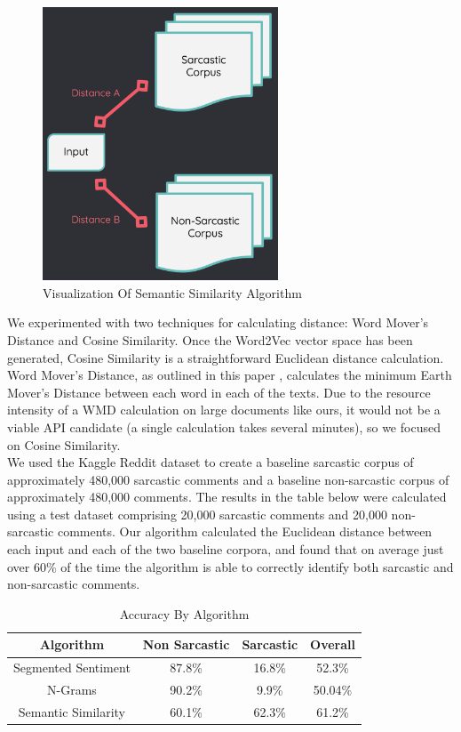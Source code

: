 \documentclass[conference]{IEEEtran}
\begin{document}
\begin{figure}[htbp]
\centerline{\includegraphics[width=7cm]{Screen Shot 2020-11-30 at 5.03.21 PM.png}}
\caption{Visualization Of Semantic Similarity Algorithm}
\label{fig7}
\end{figure}

We experimented with two techniques for calculating distance: Word Mover’s Distance and Cosine Similarity.  Once the Word2Vec vector space has been generated, Cosine Similarity is a straightforward Euclidean distance calculation.  Word Mover’s Distance, as outlined in this paper \cite{b7}, calculates the minimum Earth Mover’s Distance between each word in each of the texts.  Due to the resource intensity of a WMD calculation on large documents like ours, it would not be a viable API candidate (a single calculation takes several minutes), so we focused on Cosine Similarity.  \\ 
We used the Kaggle Reddit dataset to create a baseline sarcastic corpus of approximately 480,000 sarcastic comments and a baseline non-sarcastic corpus of approximately 480,000 comments.  The results in the table below were calculated using a test dataset comprising 20,000 sarcastic comments and 20,000 non-sarcastic comments.  Our algorithm calculated the Euclidean distance between each input and each of the two baseline corpora, and found that on average just over 60\% of the time the algorithm is able to correctly identify both sarcastic and non-sarcastic comments.\\

\begin{table}[htbp]
\caption{Accuracy By Algorithm}
\begin{center}
 \begin{tabular}{| c || c | c | c | } 
 \hline
Algorithm & Non Sarcastic & Sarcastic & Overall  \\ 
 \hline\hline
Segmented Sentiment& 87.8\% & 16.8\%  & 52.3\%   \\ 
 \hline
N-Grams& 90.2\%  & 9.9\%  & 50.04\%    \\[1ex] 
 \hline
Semantic Similarity& 60.1\%  & 62.3\%  & 61.2\%      \\[1ex] 
 \hline
\end{tabular}
\end{center}
\end{table}
\end{document}
